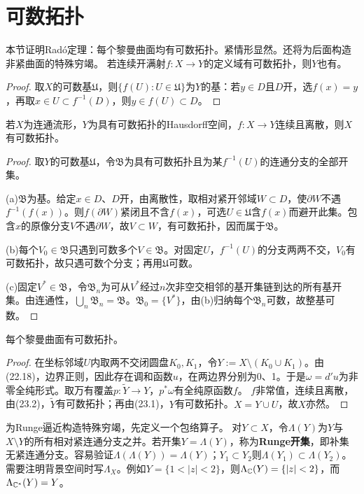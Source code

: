 \section{可数拓扑}
本节证明Radó定理：每个黎曼曲面均有可数拓扑。紧情形显然。还将为后面构造非紧曲面的特殊穷竭。
若连续开满射$f:X\to Y$的定义域有可数拓扑，则$Y$也有。
\begin{proof}
取$X$的可数基$\mathfrak U$，则$\{f(U):U\in\mathfrak U\}$为$Y$的基：若$y\in D$且$D$开，选$f(x)=y$，再取$x\in U\subset f^{-1}(D)$，则$y\in f(U)\subset D$。
\end{proof}
若$X$为连通流形，$Y$为具有可数拓扑的Hausdorff空间，$f:X\to Y$连续且离散，则$X$有可数拓扑。
\begin{proof}
取$Y$的可数基$\mathfrak U$，令$\mathfrak B$为具有可数拓扑且为某$f^{-1}(U)$的连通分支的全部开集。

(a)$\mathfrak B$为基。给定$x\in D$、$D$开，由离散性，取相对紧开邻域$W\subset D$，使$\partial W$不遇$f^{-1}(f(x))$。则$f(\partial W)$紧闭且不含$f(x)$，可选$U\in\mathfrak U$含$f(x)$而避开此集。包含$x$的原像分支$V$不遇$\partial W$，故$V\subset W$，有可数拓扑，因而属于$\mathfrak B$。

(b)每个$V_0\in\mathfrak B$只遇到可数多个$V\in\mathfrak B$。对固定$U$，$f^{-1}(U)$的分支两两不交，$V_0$有可数拓扑，故只遇可数个分支；再用$\mathfrak U$可数。

(c)固定$V^*\in\mathfrak B$，令$\mathfrak B_n$为可从$V^*$经过$n$次非空交相邻的基开集链到达的所有基开集。由连通性，$\bigcup_n\mathfrak B_n=\mathfrak B$。$\mathfrak B_0=\{V^*\}$，由(b)归纳每个$\mathfrak B_n$可数，故整基可数。
\end{proof}
每个黎曼曲面有可数拓扑。
\begin{proof}
在坐标邻域$U$内取两不交闭圆盘$K_0,K_1$，令$Y:=X\setminus(K_0\cup K_1)$。由(22.18)，边界正则，因此存在调和函数$u$，在两边界分别为0、1。于是$\omega=d'u$为非零全纯形式。取万有覆盖$p:\widetilde Y\to Y$，$p^*\omega$有全纯原函数$f$。
$f$非常值，连续且离散，由(23.2)，$\widetilde Y$有可数拓扑；再由(23.1)，$Y$有可数拓扑。$X=Y\cup U$，故$X$亦然。
\end{proof}
为Runge逼近构造特殊穷竭，先定义一个包络算子。
对$Y\subset X$，令$\Lambda(Y)$为$Y$与$X\setminus Y$的所有相对紧连通分支之并。若开集$Y=\Lambda(Y)$，称为\textbf{Runge开集}，即补集无紧连通分支。容易验证$\Lambda(\Lambda(Y))=\Lambda(Y)$；$Y_1\subset Y_2$则$\Lambda(Y_1)\subset\Lambda(Y_2)$。需要注明背景空间时写$\Lambda_X$。例如$Y=\{1<|z|<2\}$，则$\Lambda_\mathbb C(Y)=\{|z|<2\}$，而$\Lambda_{\mathbb C^*}(Y)=Y$。
